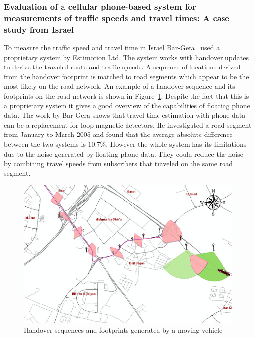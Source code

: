 \documentclass[master,english]{hgbthesis}
\begin{document}
\subsubsection{Evaluation of a cellular phone-based system for measurements of traffic speeds and travel times: A case study from Israel}
To measure the traffic speed and travel time in Israel Bar-Gera~\cite{Bar2007} used a proprietary system by Estimotion Ltd. The system works with handover updates to derive the traveled route and traffic speeds. A sequence of locations derived from the handover footprint is matched to road segments which appear to be the most likely on the road network. An example of a handover sequence and its footprints on the road network is shown in Figure~\ref{fig:bar}. Despite the fact that this is a proprietary system it gives a good overview of the capabilities of floating phone data. The work by Bar-Gera shows that travel time estimation with phone data can be a replacement for loop magnetic detectors. He investigated a road segment from January to March 2005 and found that the average absolute difference between the two systems is $10.7\%$. However the whole system has its limitations due to the noise generated by floating phone data. They could reduce the noise by combining travel speeds from subscribers that traveled on the same road segment.
\begin{figure}
\centering
\includegraphics[width=\linewidth]{images/bar}
\caption{Handover sequences and footprints generated by a moving vehicle~\cite{Bar2007}}
\label{fig:bar}
\end{figure}
\end{document}
